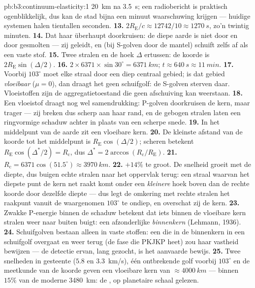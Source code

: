 \begin{solution}{pb:b3:continuum-elasticity:1}
\qty{20}{km} na \qty{3.5}{s}; een radiobericht is praktisch ogenblikkelijk,
dus kan de stad bijna een minuut waarschuwing krijgen --- huidige
systemen halen tientallen seconden.
\textbf{13.} $2R_{\text{E}}/c \approx 12742/10 \approx \qty{1270}{s}$,
zo'n twintig minuten.
\textbf{14.} Dat  haar überhaupt doorkruisen: de diepe
aarde is niet door en door gesmolten --- zij geleidt, en (bij S-golven
door de mantel) schuift zelfs af als een vaste stof.
\textbf{15.} Twee stralen en de hoek $\Delta$ ertussen: de koorde is
$2R_{\text{E}}\sin(\Delta/2)$.
\textbf{16.} $2 \times 6371 \times \sin30^\circ = \qty{6371}{km}$;
$t \approx \qty{640}{s} \approx \qty{11}{min}$.
\textbf{17.} Voorbij $103^\circ$ moet elke straal door een diep centraal
gebied; is dat gebied \emph{vloeibaar} ($\mu = 0$), dan draagt het geen
schuifgolf: de S-golven sterven daar. Vloeistoffen zijn de
aggregatietoestand die geen afschuiving kan weerstaan.
\textbf{18.} Een vloeistof draagt nog wel samendrukking: P-golven
doorkruisen de kern, maar trager --- zij breken dus scherp aan haar rand,
en de gebogen stralen laten een ringvormige schaduw achter in plaats van
een scherpe snede.
\textbf{19.} In het middelpunt van de aarde zit een vloeibare kern.
\textbf{20.} De kleinste afstand van de koorde tot het middelpunt is
$R_{\text{E}}\cos(\Delta/2)$; scheren betekent
$R_{\text{E}}\cos(\Delta^*/2) = R_{\text{c}}$, dus $\Delta^* =
2\arccos(R_{\text{c}}/R_{\text{E}})$.
\textbf{21.} $R_{\text{c}} = 6371\cos(51.5^\circ) \approx
\qty{3970}{km}$.
\textbf{22.} $+14\%$ te groot. De snelheid groeit met de diepte, dus
buigen echte stralen naar het oppervlak terug: een straal waarvan het
diepste punt de kern net raakt komt onder een \emph{kleinere} hoek boven
dan de rechte koorde door dezelfde diepte --- dus legt de omkering met
rechte stralen het raakpunt vanuit de waargenomen $103^\circ$ te ondiep,
en overschat zij de kern.
\textbf{23.} Zwakke P-energie binnen de schaduw betekent dat iets binnen
de vloeibare kern stralen weer naar buiten buigt: een afzonderlijke
\emph{binnenkern} (Lehmann, 1936).
\textbf{24.} Schuifgolven bestaan alleen in vaste stoffen: een  die
in de binnenkern in een schuifgolf overgaat en weer terug (de fase die
PKJKP heet) zou haar vastheid bewijzen --- de detectie ervan, lang
gezocht, is het aanvaarde bewijs.
\textbf{25.} Twee snelheden in gesteente ($5.8$ en \qty{3.3}{km/s}), één
ontbrekende golf voorbij $103^\circ$ en de meetkunde van de koorde geven
een vloeibare kern van $\approx\qty{4000}{km}$ --- binnen $15\%$ van de
moderne \qty{3480}{km}: de , op planetaire schaal gelezen.
\end{solution}
